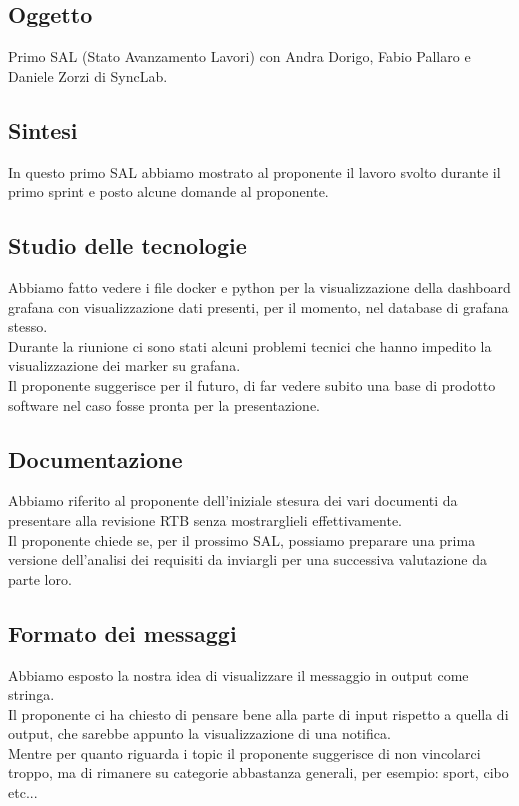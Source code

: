 \documentclass[12pt]{article}
\begin{document}
\subsection{Oggetto}
Primo SAL (Stato Avanzamento Lavori) con Andra Dorigo, Fabio Pallaro e Daniele Zorzi di SyncLab.

\subsection{Sintesi}
In questo primo SAL abbiamo mostrato al proponente il lavoro svolto durante il primo sprint e posto alcune domande al proponente.
\subsection{Studio delle tecnologie}
Abbiamo fatto vedere i file docker e python per la visualizzazione della dashboard grafana con visualizzazione dati presenti, per il momento, nel database di grafana stesso.\\
Durante la riunione ci sono stati alcuni problemi tecnici che hanno impedito la visualizzazione dei marker su grafana.\\
Il proponente suggerisce per il futuro, di far vedere subito una base di prodotto software nel caso fosse pronta per la presentazione.

\subsection{Documentazione}
Abbiamo riferito al proponente dell'iniziale stesura dei vari documenti da presentare alla revisione RTB senza mostrarglieli effettivamente.\\
Il proponente chiede se, per il prossimo SAL, possiamo preparare una prima versione dell'analisi dei requisiti da inviargli per una successiva valutazione da parte loro.

\subsection{Formato dei messaggi}
Abbiamo esposto la nostra idea di visualizzare il messaggio in output come stringa.\\
Il proponente ci ha chiesto di pensare bene alla parte di input rispetto a quella di output, che sarebbe appunto la visualizzazione di una notifica.\\
Mentre per quanto riguarda i topic il proponente suggerisce di non vincolarci troppo, ma di rimanere su categorie abbastanza generali, per esempio: sport, cibo etc...
\end{document}
